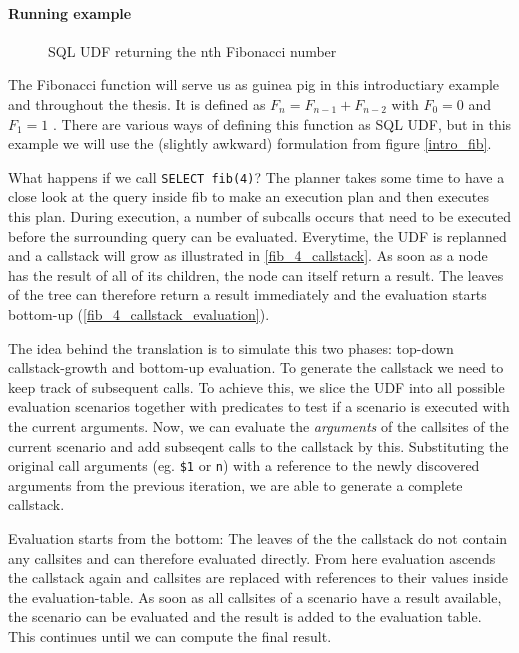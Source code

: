 \paragraph*{Running example}

\begin{wrapfigure}{r}{0.5\textwidth}
  \vspace{-20pt}
  \caption{SQL UDF returning the nth Fibonacci number}
  \label{intro_fib}
\end{wrapfigure}


The Fibonacci function will serve us as guinea pig in this introductiary example and throughout the thesis.
It is defined as $F_n = F_{n-1} + F_{n-2}$ with $F_0 = 0$ and $F_1 = 1$ \cite[p. 79]{TAOCP_Knuth}. There are various ways of defining this
function as SQL UDF, but in this example we will use the (slightly awkward) formulation from figure \autoref{intro_fib}.

What happens if we call \texttt{SELECT fib(4)}? The planner takes some time to have a close look at the query inside fib to make an execution plan and then executes this plan. During execution, a number of subcalls occurs that need to be executed before the surrounding query can be evaluated. Everytime, the UDF is replanned and a callstack will grow as illustrated in \autoref{fib_4_callstack}. As soon as a node has the result of all of its children, the node can itself return a result. The leaves of the tree can therefore return a result immediately and the evaluation starts bottom-up (\autoref{fib_4_callstack_evaluation}). 

The idea behind the translation is to simulate this two phases: top-down callstack-growth and bottom-up evaluation. To generate the callstack we need to keep track of subsequent calls. To achieve this, we slice the UDF into all possible evaluation scenarios together with predicates to test if a scenario is executed with the current arguments. Now, we can evaluate the \textit{arguments} of the callsites of the current scenario and add subseqent calls to the callstack by this. Substituting the original call arguments (eg. \texttt{\$1} or \texttt{n}) with a reference to the newly discovered arguments from the previous iteration, we are able to generate a complete callstack.

Evaluation starts from the bottom: The leaves of the the callstack do not contain any callsites and can therefore evaluated directly. From here evaluation ascends the callstack again and callsites are replaced with references to their values inside the evaluation-table. As soon as all callsites of a scenario have a result available, the scenario can be evaluated and the result is added to the evaluation table. This continues until we can compute the final result.

